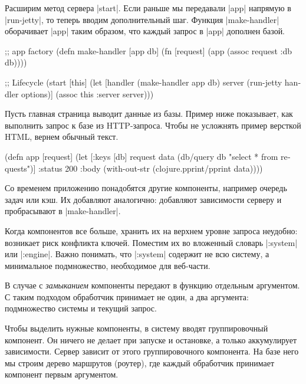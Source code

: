 Расширим метод сервера \spverb|start|. Если раньше мы передавали \spverb|app|
напрямую в \spverb|run-jetty|, то теперь вводим дополнительный шаг. Функция
\spverb|make-handler| оборачивает \spverb|app| таким образом, что каждый запрос
в \spverb|app| дополнен базой.

\begin{english}
  \begin{clojure}
;; app factory
(defn make-handler [app db]
  (fn [request]
    (app (assoc request :db db))))

;; Lifecycle
(start [this]
  (let [handler (make-handler app db)
        server (run-jetty handler options)]
    (assoc this :server server)))
  \end{clojure}
\end{english}

Пусть главная страница выводит данные из базы. Пример ниже показывает, как
выполнить запрос к базе из HTTP-запроса. Чтобы не усложнять пример версткой
HTML, вернем обычный текст.

\begin{english}
  \begin{clojure}
(defn app [request]
  (let [{:keys [db]} request
        data (db/query db "select * from requests")]
    {:status 200
     :body (with-out-str
             (clojure.pprint/pprint data))}))
  \end{clojure}
\end{english}

Со временем приложению понадобятся другие компоненты, например очередь задач или
кэш. Их добавляют аналогично: добавляют зависимости серверу и пробрасывают в
\spverb|make-handler|.

Когда компонентов все больше, хранить их на верхнем уровне запроса неудобно:
возникает риск конфликта ключей. Поместим их во вложенный словарь
\spverb|:system| или \spverb|:engine|. Важно понимать, что \spverb|:system|
содержит не всю систему, а минимальное подмножество, необходимое для веб-части.

В случае с \emph{замыканием} компоненты передают в функцию отдельным
аргументом. С таким подходом обработчик принимает не один, а два аргумента:
подмножество системы и текущий запрос.

Чтобы выделить нужные компоненты, в систему вводят группировочный компонент. Он
ничего не делает при запуске и остановке, а только аккумулирует
зависимости. Сервер зависит от этого группировочного компонента. На базе него мы
строим дерево маршрутов (роутер), где каждый обработчик принимает компонент
первым аргументом.

